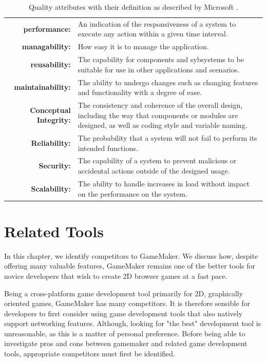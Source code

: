 \documentclass[bsc, 12pt, twoside, singlespacing, parskip, abbrevs, notimes, normalheadings, logo, deptreport]{styles/infthesis}
\begin{document}
\begin{table}[H]
\centering
  \begin{tabularx}{\textwidth}{r X}
	\textbf{performance:} & An indication of the responsiveness of a system to execute any action within a given time interval.\\
	\textbf{managability:} & How easy it is to manage the application.\\
	\textbf{reusability:} & The capability for components and sybsystems to be suitable for use in other applications and scenarios.\\
	\textbf{maintainability:} & The ability to undergo changes such as changing features and functionality with a degree of ease.\\
	\textbf{Conceptual Integrity:} & The consistency and coherence of the overall design, including the way that components or modules are designed, as well as coding style and variable naming.\\
	\textbf{Reliability:} & The probability that a system will not fail to perform its intended functions. \\
	\textbf{Security:} & The capability of a system to prevent malicious or accidental actions outside of the designed usage. \\
	\textbf{Scalability:} & The ability to handle increases in load without impact on the performance on the system. \\
  \end{tabularx}
  \caption{Quality attributes with their definition as described by Microsoft \cite{quality_attributes}.}
\label{table:quality_attributes}
\end{table}

\chapter{Related Tools}
\vspace{-1em}
In this chapter, we identify competitors to GameMaker. We discuss how, despite offering many valuable features, GameMaker remains one of the better tools for novice developers that wish to create 2D browser games at a fast pace.

Being a cross-platform game development tool primarily for 2D, graphically oriented games, GameMaker has many competitors. It is therefore sensible for developers to first consider using game development tools that also natively support networking features. Although, looking for "the best" development tool is unreasonable, as this is a matter of personal preference. Before being able to investigate pros and cons between gamemaker and related game development tools, appropriate competitors must first be identified.
\end{document}
